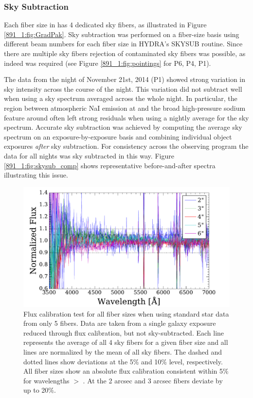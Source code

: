 \subsubsection{Sky Subtraction}
\label{891_1:sec:skysub}

Each fiber size in \GP has 4 dedicated sky fibers, as illustrated in
Figure \ref{891_1:fig:GradPak}.  Sky subtraction was performed on a
fiber-size basis using different beam numbers for each fiber size in
HYDRA's SKYSUB routine.  Since there are multiple sky fibers rejection
of contaminated sky fibers was possible, as indeed was required (see
Figure \ref{891_1:fig:pointings} for P6, P4, P1).

The data from the night of November 21st, 2014 (P1) showed strong
variation in sky intensity across the course of the night. This
variation did not subtract well when using a sky spectrum averaged
across the whole night. In particular, the region between atmospheric
NaI emission at  and the broad high-pressure sodium
feature around  often left strong residuals when using
a nightly average for the sky spectrum. Accurate sky subtraction was
achieved by computing the average sky spectrum on an
exposure-by-exposure basis and combining individual object exposures
\emph{after} sky subtraction. For consistency across the observing
program the data for all nights was sky subtracted in this way. Figure
\ref{891_1:fig:skysub_comp} shows representative before-and-after spectra
illustrating this issue.

\begin{figure}
  \centering
  \includegraphics[width=\columnwidth]{891_1/figs/flux_cal_test.pdf}
  \caption[Comparison of flux calibration across multiple fiber
    sizes]{ \label{891_1:fig:sky_flux_comp}\fixspacing Flux
    calibration test for all fiber sizes when using standard star data
    from only 5 fibers. Data are taken from a single galaxy
    exposure reduced through flux calibration, but not
    sky-subtracted. Each line represents the average of all 4 sky
    fibers for a given fiber size and all lines are normalized by the
    mean of all sky fibers. The dashed and dotted lines show
    deviations at the 5\% and 10\% level, respectively. All fiber
    sizes show an absolute flux calibration consistent within 5\% for
    wavelengths $>$ . At  the 2 arcsec
    and 3 arcsec fibers deviate by up to 20\%.}
\end{figure}

